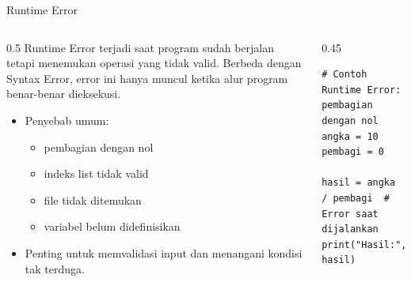 \documentclass[aspectratio=169, table]{beamer}
\begin{document}
\begin{frame}[fragile]{Runtime Error}
\vspace{20pt}

\begin{columns}[T]
    \begin{column}{0.5\linewidth}
        Runtime Error terjadi saat program sudah berjalan tetapi menemukan operasi yang tidak valid.  
        Berbeda dengan Syntax Error, error ini hanya muncul ketika alur program benar-benar dieksekusi.

        \begin{itemize}
            \item Penyebab umum:
            \begin{itemize}
                \item pembagian dengan nol
                \item indeks list tidak valid
                \item file tidak ditemukan
                \item variabel belum didefinisikan
            \end{itemize}
            \item Penting untuk memvalidasi input dan menangani kondisi tak terduga.
        \end{itemize}
    \end{column}

    \begin{column}{0.45\linewidth}
\begin{lstlisting}[style=PythonStyle, basicstyle=\ttfamily\scriptsize]
# Contoh Runtime Error: pembagian dengan nol
angka = 10
pembagi = 0

hasil = angka / pembagi  # Error saat dijalankan
print("Hasil:", hasil)
\end{lstlisting}
    \end{column}
\end{columns}

\end{frame}

\end{document}
